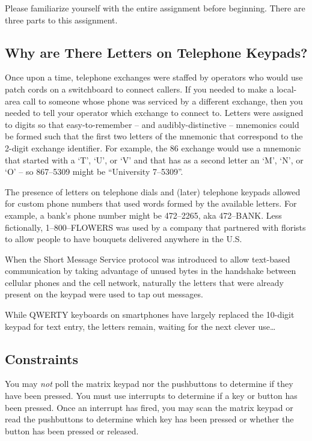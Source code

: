 Please familiarize yourself with the entire assignment before beginning.
There are three parts to this assignment.

\subsection{Why are There Letters on Telephone Keypads?}

Once upon a time, telephone exchanges were staffed by operators who would use patch cords on a switchboard to connect callers.
If you needed to make a local-area call to someone whose phone was serviced by a different exchange, then you needed to tell your operator which exchange to connect to.
Letters were assigned to digits so that easy-to-remember -- and audibly-distinctive -- mnemonics could be formed such that the first two letters of the mnemonic that correspond to the 2-digit exchange identifier.
For example, the 86 exchange would use a mnemonic that started with a `T', `U', or `V' and that has as a second letter an `M', `N', or `O' --
so 867--5309 might be ``University 7--5309''.

The presence of letters on telephone dials and (later) telephone keypads allowed for custom phone numbers that used words formed by the available letters.
For example, a bank's phone number might be 472--2265, aka 472--BANK.
Less fictionally, 1--800--FLOWERS was used by a company that partnered with florists to allow people to have bouquets delivered anywhere in the U.S\@.

When the Short Message Service protocol was introduced to allow text-based communication by taking advantage of unused bytes in the handshake between cellular phones and the cell network, naturally the letters that were already present on the keypad were used to tap out messages.

While QWERTY keyboards on smartphones have largely replaced the 10-digit keypad for text entry, the letters remain, waiting for the next clever use\dots

\subsection{Constraints} \label{subsec:constraints}

You may \textit{not} poll the matrix keypad nor the pushbuttons to determine if they have been pressed.
You must use interrupts to determine if a key or button has been pressed.
Once an interrupt has fired, you may scan the matrix keypad or read the pushbuttons to determine which key has been pressed or whether the button has been pressed or released.

